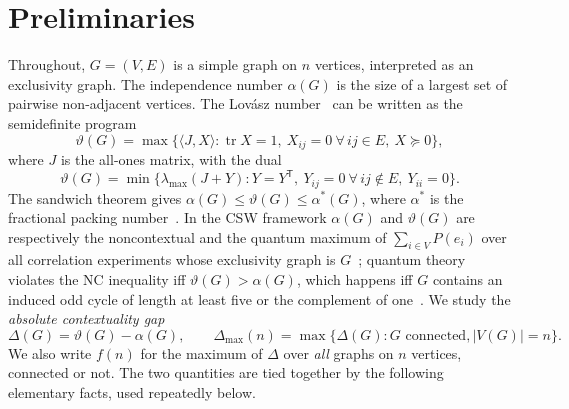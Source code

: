 \documentclass[11pt]{article}
\renewcommand{\theta}{\vartheta}
\newcommand{\gap}{\Delta}
\begin{document}
\section{Preliminaries}\label{sec:prelim}

Throughout, $G=(V,E)$ is a simple graph on $n$ vertices, interpreted as an exclusivity graph. The independence number $\alpha(G)$ is the size of a largest set of pairwise non-adjacent vertices. The Lov\'asz number~\cite{lovasz1979} can be written as the semidefinite program
\begin{equation}\label{eq:theta-primal}
\theta(G)=\max\bigl\{\langle J,X\rangle : \operatorname{tr}X=1,\ X_{ij}=0\ \forall\,ij\in E,\ X\succeq 0\bigr\},
\end{equation}
where $J$ is the all-ones matrix, with the dual
\begin{equation}\label{eq:theta-dual}
\theta(G)=\min\bigl\{\lambda_{\max}(J+Y) : Y=Y^{\mathsf T},\ Y_{ij}=0\ \forall\, ij\notin E,\ Y_{ii}=0\bigr\}.
\end{equation}
The sandwich theorem gives $\alpha(G)\le\theta(G)\le\alpha^*(G)$, where $\alpha^*$ is the fractional packing number~\cite{knuth1994}. In the CSW framework $\alpha(G)$ and $\theta(G)$ are respectively the noncontextual and the quantum maximum of $\sum_{i\in V}P(e_i)$ over all correlation experiments whose exclusivity graph is $G$~\cite{csw2014}; quantum theory violates the NC inequality iff $\theta(G)>\alpha(G)$, which happens iff $G$ contains an induced odd cycle of length at least five or the complement of one~\cite{cabello2013basic}. We study the \emph{absolute contextuality gap}
\begin{equation}
\gap(G)=\theta(G)-\alpha(G),\qquad \gap_{\max}(n)=\max\{\gap(G): G \text{ connected}, |V(G)|=n\}.
\end{equation}
We also write $f(n)$ for the maximum of $\gap$ over \emph{all} graphs on $n$ vertices, connected or not. The two quantities are tied together by the following elementary facts, used repeatedly below.
\end{document}
